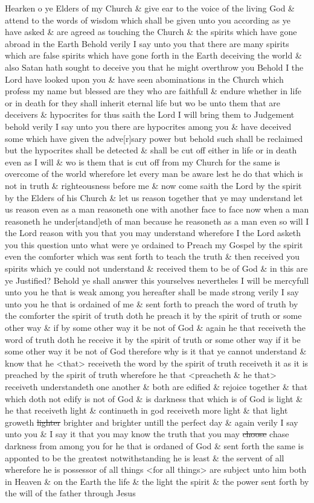 				Hearken o ye Elders of my Church \& give ear to the voice of the living God \& attend to the words of wisdom which shall be given unto you according as ye have asked \& are agreed as touching the Church \& the spirits which have gone abroad in the Earth Behold verily I say unto you that there are many spirits which are false spirits which have gone forth in the Earth deceiving the world \& also Satan hath sought to deceive you that he might overthrow you Behold I the Lord have looked upon you \& have seen abominations in the Church which profess my name but blessed are they who are faithfull \& endure whether in life or in death for they shall inherit eternal life but wo be unto them that are deceivers \& hypocrites for thus saith the Lord I will bring them to Judgement behold verily I say unto you there are hypocrites among you \& have deceived some which have given the adve[r]sary power but behold such shall be reclaimed but the hypocrites shall be detected \& shall be cut off either in life or in death even as I will \& wo is them that is cut off from my Church for the same is overcome of the world wherefore let every man be aware lest he do that which is not in truth \& righteousness before me \& now come saith the Lord by the spirit by the Elders of his Church \& let us reason together that ye may understand let us reason even as a man reasoneth one with another face to face now when a man reasoneth he under[stand]eth of man because he reasoneth as a man even so will I the Lord reason with you that you may understand wherefore I the Lord asketh you this question unto what were ye ordained to Preach my Gospel by the spirit even the comforter which was sent forth to teach the truth \& then received you spirits which ye could not understand \& received them to be of God \& in this are ye Justified? Behold ye shall answer this yourselves nevertheles I will be mercyfull unto you he that is weak among you hereafter shall be made strong verily I say unto you he that is ordained of me \& sent forth to preach the word of truth by the comforter the spirit of truth doth he preach it by the spirit of truth or some other way \& if by some other way it be not of God \& again he that receiveth the word of truth doth he receive it by the spirit of truth or some other way if it be some other way it be not of God therefore why is it that ye cannot understand \& know that he <that> receiveth the word by the spirit of truth receiveth it as it is preached by the spirit of truth wherefore he that <preacheth \& he that> receiveth understandeth one another \& both are edified \& rejoice together \& that which doth not edify is not of God \& is darkness that which is of God is light \& he that receiveth light \& continueth in god receiveth more light \& that light groweth \sout{lighter} brighter and brighter untill the perfect day \& again verily I say unto you \& I say it that you may know the truth that you may \sout{choose} chase darkness from among you for he that is ordaned of God \& sent forth the same is apponted to be the greatest notwithstanding he is least \& the servent of all wherefore he is possessor of all things <for all things> are subject unto him both in Heaven \& on the Earth the life \& the light the spirit \& the power sent forth by the will of the father through Jesus 